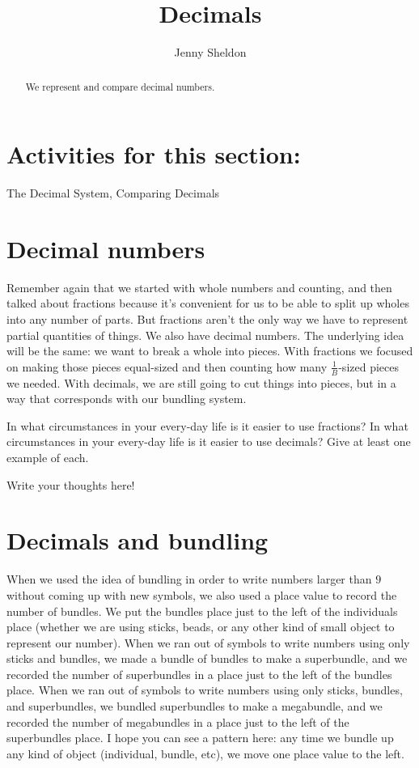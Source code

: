 \documentclass{ximera}
\title{Decimals}
\author{Jenny Sheldon}
\begin{document}
\begin{abstract}
We represent and compare decimal numbers.
\end{abstract}
\maketitle

\section{Activities for this section:} The Decimal System, Comparing Decimals

\section{Decimal numbers}

Remember again that we started with whole numbers and counting, and then talked about fractions because it's convenient for us to be able to split up wholes into any number of parts. But fractions aren't the only way we have to represent partial quantities of things. We also have decimal numbers. The underlying idea will be the same: we want to break a whole  into pieces. With fractions we focused on making those pieces equal-sized and then counting how many $\frac{1}{B}$-sized pieces we needed. With decimals, we are still going to cut things into pieces, but in a way that corresponds with our bundling system. 


\begin{question}
In what circumstances in your every-day life is it easier to use fractions? In what circumstances in your every-day life is it easier to use decimals? Give at least one example of each.
\begin{freeResponse}
Write your thoughts here!
\end{freeResponse}
\end{question}

\section{Decimals and bundling}

When we used the idea of bundling in order to write numbers larger than $9$ without coming up with new symbols, we also used a place value to record the number of bundles. We put the bundles place just to the left of the individuals place (whether we are using sticks, beads, or any other kind of small object to represent our number). When we ran out of symbols to write numbers using only sticks and bundles, we made a bundle of bundles to make a superbundle, and we recorded the number of superbundles in a place just to the left of the bundles place. When we ran out of symbols to write numbers using only sticks, bundles, and superbundles, we bundled superbundles to make a megabundle, and we recorded the number of megabundles in a place just to the left of the superbundles place.  I hope you can see a pattern here: any time we bundle up any kind of object (individual, bundle, etc), we move one place value to the left. %
\end{document}
